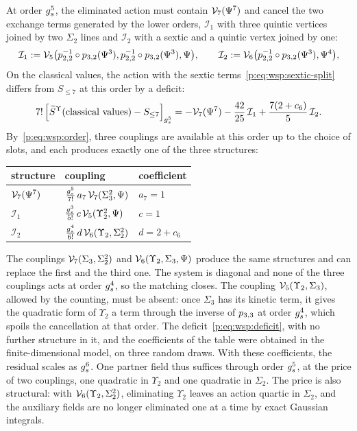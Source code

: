 At order $g_s^5$, the eliminated action must contain $\mathcal{V}_{7}(\Psi^7)$ and cancel the two exchange terms generated by the lower orders, $\mathcal{I}_1$ with three quintic vertices joined by two $\Sigma_2$ lines and $\mathcal{I}_2$ with a sextic and a quintic vertex joined by one:
  \begin{equation}
  \label{p:eq:wsp:S12}
  \mathcal{I}_1
    := \mathcal{V}_{5}\big(p_{2,2}^{-1} \circ p_{3,2}(\Psi^3), p_{2,2}^{-1} \circ p_{3,2}(\Psi^3), \Psi\big),
  \qquad
  \mathcal{I}_2
    := \mathcal{V}_{6}\big(p_{2,2}^{-1} \circ p_{3,2}(\Psi^3), \Psi^4\big),
\end{equation}
  On the classical values, the action with the sextic terms~\eqref{p:eq:wsp:sextic-split} differs from $S_{\le 7}$ at this order by a deficit:
  \begin{equation}
  \label{p:eq:wsp:deficit}
  7! \, \Big[ \widetilde{S}_{}^{\Upsilon}(\text{classical values}) - S_{\le 7} \Big]_{g_s^5}
    = - \mathcal{V}_{7}(\Psi^7)
      - \frac{42}{25} \, \mathcal{I}_1
      + \frac{7 (2 + c_6)}{5} \, \mathcal{I}_2.
\end{equation}
  By~\eqref{p:eq:wsp:order}, three couplings are available at this order up to the choice of slots, and each produces exactly one of the three structures:
  \begin{center}
    \begin{tabular}{lll}
      \hline
      structure            & coupling                                                      & coefficient   \\
      \hline
      $\mathcal{V}_{7}(\Psi^7)$ & $\frac{g_s^5}{7!} \, a_7 \, \mathcal{V}_{7}(\Sigma_3^2, \Psi)$     & $a_7 = 1$     \\
      $\mathcal{I}_1$      & $\frac{g_s^3}{5!} \, c \, \mathcal{V}_{5}(\Upsilon_2^2, \Psi)$     & $c = 1$       \\
      $\mathcal{I}_2$      & $\frac{g_s^4}{6!} \, d \, \mathcal{V}_{6}(\Upsilon_2, \Sigma_2^2)$ & $d = 2 + c_6$ \\
      \hline
    \end{tabular}
  \end{center}
  The couplings $\mathcal{V}_{7}(\Sigma_3, \Sigma_2^2)$ and $\mathcal{V}_{6}(\Upsilon_2, \Sigma_3, \Psi)$ produce the same structures and can replace the first and the third one.
  The system is diagonal and none of the three couplings acts at order $g_s^4$, so the matching closes.
  The coupling $\mathcal{V}_{5}(\Upsilon_2, \Sigma_3)$, allowed by the counting, must be absent: once $\Sigma_3$ has its kinetic term, it gives the quadratic form of $\Upsilon_2$ a term through the inverse of $p_{3,3}$ at order $g_s^4$, which spoils the cancellation at that order.
  The deficit~\eqref{p:eq:wsp:deficit}, with no further structure in it, and the coefficients of the table were obtained in the finite-dimensional model, on three random draws.
  With these coefficients, the residual scales as $g_s^6$.
  One partner field thus suffices through order $g_s^5$, at the price of two couplings, one quadratic in $\Upsilon_2$ and one quadratic in $\Sigma_2$.
  The price is also structural: with $\mathcal{V}_{6}(\Upsilon_2, \Sigma_2^2)$, eliminating $\Upsilon_2$ leaves an action quartic in $\Sigma_2$, and the auxiliary fields are no longer eliminated one at a time by exact Gaussian integrals.

